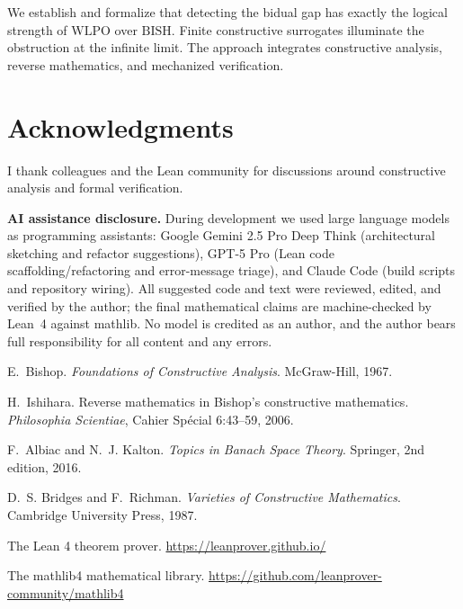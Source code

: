 \documentclass{lmcs}
\newcommand{\WLPO}{\mathrm{WLPO}}
\newcommand{\BISH}{\mathrm{BISH}}
\begin{document}
We establish and formalize that detecting the bidual gap has exactly the logical strength of $\WLPO$ over $\BISH$. Finite constructive surrogates illuminate the obstruction at the infinite limit. The approach integrates constructive analysis, reverse mathematics, and mechanized verification.

\section*{Acknowledgments}

I thank colleagues and the Lean community for discussions around constructive analysis and formal verification.

\smallskip
\noindent\textbf{AI assistance disclosure.} During development we used large language models as programming assistants: Google Gemini 2.5 Pro Deep Think (architectural sketching and refactor suggestions), GPT-5 Pro (Lean code scaffolding/refactoring and error-message triage), and Claude Code (build scripts and repository wiring). All suggested code and text were reviewed, edited, and verified by the author; the final mathematical claims are machine-checked by Lean~4 against mathlib. No model is credited as an author, and the author bears full responsibility for all content and any errors.


\begin{thebibliography}{10}

E.~Bishop.
\newblock \emph{Foundations of Constructive Analysis}.
\newblock McGraw-Hill, 1967.

H.~Ishihara.
\newblock Reverse mathematics in Bishop's constructive mathematics.
\newblock \emph{Philosophia Scientiae}, Cahier Sp\'ecial 6:43--59, 2006.

F.~Albiac and N.~J. Kalton.
\newblock \emph{Topics in Banach Space Theory}.
\newblock Springer, 2nd edition, 2016.

D.~S. Bridges and F.~Richman.
\newblock \emph{Varieties of Constructive Mathematics}.
\newblock Cambridge University Press, 1987.

The Lean 4 theorem prover.
\newblock \url{https://leanprover.github.io/}

The mathlib4 mathematical library.
\newblock \url{https://github.com/leanprover-community/mathlib4}

\end{thebibliography}
\end{document}
